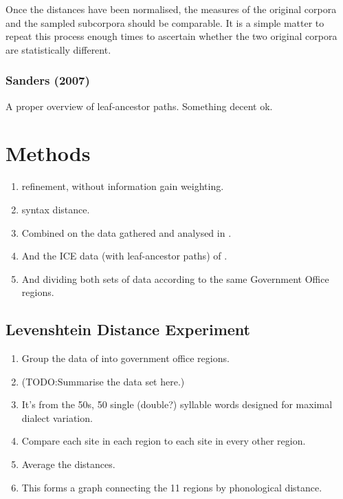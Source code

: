 \documentclass[11pt]{article}
\begin{document}
Once the distances have been normalised, the measures of the original
corpora and the sampled subcorpora should be comparable. It is a
simple matter to repeat this process enough times to ascertain whether
the two original corpora are statistically different.

\subsubsection{Sanders (2007)}
A proper overview of leaf-ancestor paths. Something decent ok.

\section{Methods}
\begin{enumerate}
\item {} refinement, without information gain weighting.
\item {} syntax distance.
\item Combined on the data gathered and analysed in .
\item And the ICE data (with leaf-ancestor paths) of .
\item And dividing both sets of data according to the same Government
  Office regions.
\end{enumerate}
\subsection{Levenshtein Distance Experiment}
\begin{enumerate}
\item Group the data of \cite{shackleton07} into government office
  regions.
\item (TODO:Summarise the data set here.)
\item It's from the 50s, 50 single (double?) syllable words designed
  for maximal dialect variation.
\item Compare each site in each region to each site in every other region.
\item Average the distances.
\item This forms a graph connecting the 11 regions by phonological distance.
\end{enumerate}
\end{document}
